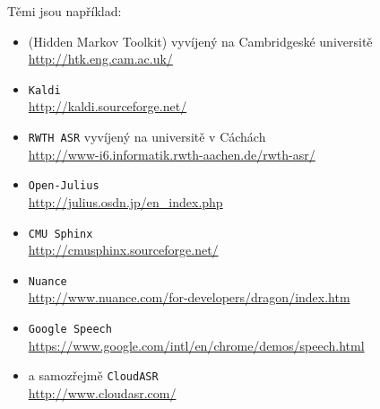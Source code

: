 Těmi jsou například:
\begin{itemize}
\item {} (Hidden Markov Toolkit) vyvíjený na Cambridgeské universitě \\ \url{http://htk.eng.cam.ac.uk/}
\item \verb|Kaldi| \\ \url{http://kaldi.sourceforge.net/}
\item \verb|RWTH ASR| vyvíjený na universitě v Cáchách \\ \url{http://www-i6.informatik.rwth-aachen.de/rwth-asr/}
\item \verb|Open-Julius| \\ \url{http://julius.osdn.jp/en_index.php}
\item \verb|CMU Sphinx| \\ \url{http://cmusphinx.sourceforge.net/}
\item \verb|Nuance| \\ \url{http://www.nuance.com/for-developers/dragon/index.htm}
\item \verb|Google Speech| \\ \url{https://www.google.com/intl/en/chrome/demos/speech.html}
\item a samozřejmě \verb|CloudASR| \\ \url{http://www.cloudasr.com/}
\end{itemize}